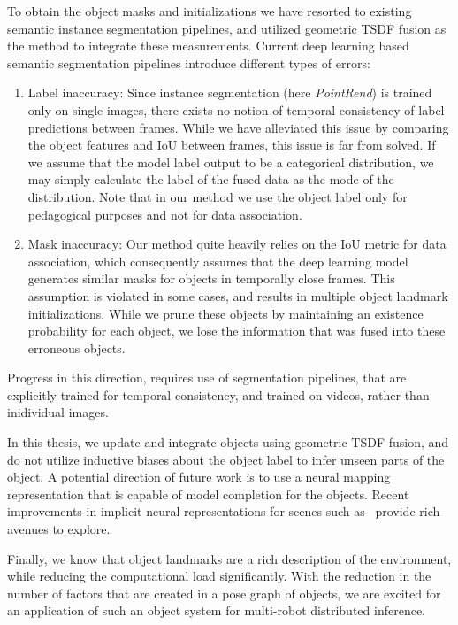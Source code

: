 To obtain the object masks and initializations we have resorted to existing semantic instance segmentation pipelines, and utilized geometric TSDF fusion as the method to integrate these measurements. Current deep learning based semantic segmentation pipelines introduce different types of errors:
\begin{enumerate}
    \item Label inaccuracy: Since instance segmentation (here \emph{PointRend}) is trained only on single images, there exists no notion of temporal consistency of label predictions between frames. While we have alleviated this issue by comparing the object features and IoU between frames, this issue is far from solved. If we assume that the model label output to be a  categorical distribution, we may simply calculate the label of the fused data as the mode of the distribution. Note that in our method we use the object label only for pedagogical purposes and not for data association.
    \item Mask inaccuracy: Our method quite heavily relies on the IoU metric for data association, which consequently assumes that the deep learning model generates similar masks for objects in temporally close frames. This assumption is violated in some cases, and results in multiple object landmark initializations. While we prune these objects by maintaining an existence probability for each object, we lose the information that was fused into these erroneous objects.
\end{enumerate}

Progress in this direction, requires use of segmentation pipelines, that are explicitly trained for temporal consistency, and trained on videos, rather than inidividual images.

In this thesis, we update and integrate objects using geometric TSDF fusion, and do not utilize inductive biases about the object label to infer unseen parts of the object. A potential direction of future work is to use a neural mapping representation that is capable of model completion for the objects. Recent improvements in implicit neural representations for scenes such as~\cite{parkDeepSDFLearningContinuous2019, mildenhallNeRFRepresentingScenes2020} provide rich avenues to explore.

Finally, we know that object landmarks are a rich description of the environment, while reducing the computational load significantly. With the reduction in the number of factors that are created in a pose graph of objects, we are excited for an application of such an object system for multi-robot distributed inference.
